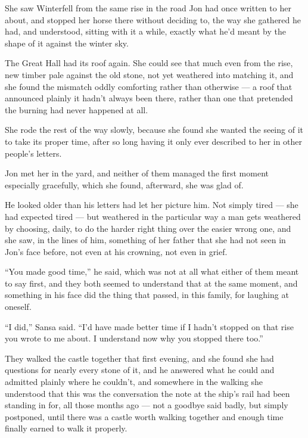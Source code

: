She saw Winterfell from the same rise in the road Jon had once written to her about, and stopped her horse there without deciding to, the way she gathered he had, and understood, sitting with it a while, exactly what he’d meant by the shape of it against the winter sky.

The Great Hall had its roof again. She could see that much even from the rise, new timber pale against the old stone, not yet weathered into matching it, and she found the mismatch oddly comforting rather than otherwise — a roof that announced plainly it hadn’t always been there, rather than one that pretended the burning had never happened at all.

She rode the rest of the way slowly, because she found she wanted the seeing of it to take its proper time, after so long having it only ever described to her in other people’s letters.

\sceneBreak

Jon met her in the yard, and neither of them managed the first moment especially gracefully, which she found, afterward, she was glad of.

He looked older than his letters had let her picture him. Not simply tired — she had expected tired — but weathered in the particular way a man gets weathered by choosing, daily, to do the harder right thing over the easier wrong one, and she saw, in the lines of him, something of her father that she had not seen in Jon’s face before, not even at his crowning, not even in grief.

“You made good time,” he said, which was not at all what either of them meant to say first, and they both seemed to understand that at the same moment, and something in his face did the thing that passed, in this family, for laughing at oneself.

“I did,” Sansa said. “I’d have made better time if I hadn’t stopped on that rise you wrote to me about. I understand now why you stopped there too.”

\sceneBreak

They walked the castle together that first evening, and she found she had questions for nearly every stone of it, and he answered what he could and admitted plainly where he couldn’t, and somewhere in the walking she understood that this was the conversation the note at the ship’s rail had been standing in for, all those months ago — not a goodbye said badly, but simply postponed, until there was a castle worth walking together and enough time finally earned to walk it properly.

